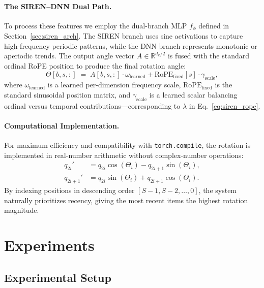 \documentclass{article}
\begin{document}
\paragraph{The SIREN--DNN Dual Path.}
To process these features we employ the dual-branch MLP $f_\phi$ defined in
Section~\ref{sec:siren_arch}. The SIREN branch uses sine activations to capture
high-frequency periodic patterns, while the DNN branch represents monotonic or
aperiodic trends. The output angle vector $A \in \mathbb{R}^{d_k/2}$ is fused with
the standard ordinal RoPE position to produce the final rotation angle:
\begin{equation}
  \Theta[b, s, :] \;=\; A[b, s, :] \cdot \omega_{\text{learned}}
    + \mathrm{RoPE}_{\text{fixed}}[s] \cdot \gamma_{\text{scale}},
  \label{eq:siren_rope_impl}
\end{equation}
where $\omega_{\text{learned}}$ is a learned per-dimension frequency scale,
$\mathrm{RoPE}_{\text{fixed}}$ is the standard sinusoidal position matrix, and
$\gamma_{\text{scale}}$ is a learned scalar balancing ordinal versus temporal
contributions---corresponding to $\lambda$ in Eq.~\eqref{eq:siren_rope}.

\paragraph{Computational Implementation.}
For maximum efficiency and compatibility with \texttt{torch.compile}, the rotation
is implemented in real-number arithmetic without complex-number operations:
\begin{align}
  q_{2i}'   &= q_{2i}   \cos(\Theta_i) - q_{2i+1} \sin(\Theta_i), \\
  q_{2i+1}' &= q_{2i}   \sin(\Theta_i) + q_{2i+1} \cos(\Theta_i).
\end{align}
By indexing positions in descending order $[S{-}1, S{-}2, \ldots, 0]$, the system
naturally prioritizes recency, giving the most recent items the highest rotation
magnitude.

\section{Experiments}
\label{sec:experiments}

\subsection{Experimental Setup}
\end{document}
